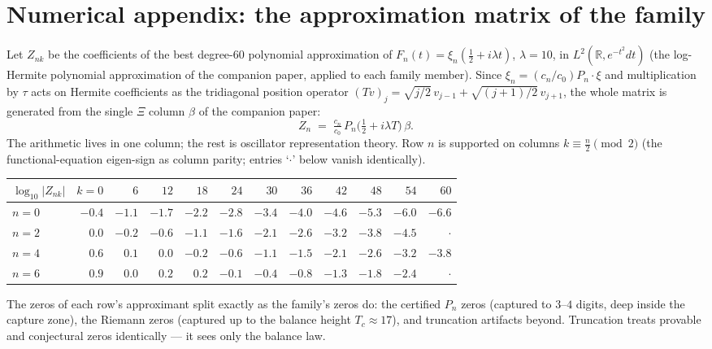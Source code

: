 \documentclass[11pt]{article}
\theoremstyle{remark}
\newcommand{\R}{\mathbb{R}}
\begin{document}
\section{Numerical appendix: the approximation matrix of the family}

Let $Z_{nk}$ be the coefficients of the best degree-$60$ polynomial approximation of $F_n(t) = \xi_n(\tfrac12 + i\lambda t)$, $\lambda = 10$, in $L^2(\R, e^{-t^2}dt)$ (the log-Hermite polynomial approximation of the companion paper, applied to each family member). Since $\xi_n = (c_n/c_0) P_n \cdot \xi$ and multiplication by $\tau$ acts on Hermite coefficients as the tridiagonal position operator $(Tv)_j = \sqrt{j/2}\,v_{j-1} + \sqrt{(j+1)/2}\,v_{j+1}$, the whole matrix is generated from the single $\Xi$ column $\beta$ of the companion paper:
\[
Z_n \;=\; \tfrac{c_n}{c_0}\, P_n\bigl(\tfrac12 + i\lambda T\bigr)\, \beta .
\]
The arithmetic lives in one column; the rest is oscillator representation theory. Row $n$ is supported on columns $k \equiv \tfrac n2 \pmod 2$ (the functional-equation eigen-sign as column parity; entries `$\cdot$' below vanish identically).

\begin{center}
\begin{tabular}{@{}lrrrrrrrrrrr@{}}
\toprule
$\log_{10}|Z_{nk}|$ & $k{=}0$ & $6$ & $12$ & $18$ & $24$ & $30$ & $36$ & $42$ & $48$ & $54$ & $60$ \\
\midrule
$n=0$ & $-0.4$ & $-1.1$ & $-1.7$ & $-2.2$ & $-2.8$ & $-3.4$ & $-4.0$ & $-4.6$ & $-5.3$ & $-6.0$ & $-6.6$ \\
$n=2$ & $0.0$ & $-0.2$ & $-0.6$ & $-1.1$ & $-1.6$ & $-2.1$ & $-2.6$ & $-3.2$ & $-3.8$ & $-4.5$ & $\cdot$ \\
$n=4$ & $0.6$ & $0.1$ & $0.0$ & $-0.2$ & $-0.6$ & $-1.1$ & $-1.5$ & $-2.1$ & $-2.6$ & $-3.2$ & $-3.8$ \\
$n=6$ & $0.9$ & $0.0$ & $0.2$ & $0.2$ & $-0.1$ & $-0.4$ & $-0.8$ & $-1.3$ & $-1.8$ & $-2.4$ & $\cdot$ \\
\bottomrule
\end{tabular}
\end{center}

The zeros of each row's approximant split exactly as the family's zeros do: the certified $P_n$ zeros (captured to $3$--$4$ digits, deep inside the capture zone), the Riemann zeros (captured up to the balance height $T_c \approx 17$), and truncation artifacts beyond. Truncation treats provable and conjectural zeros identically --- it sees only the balance law.
\end{document}
